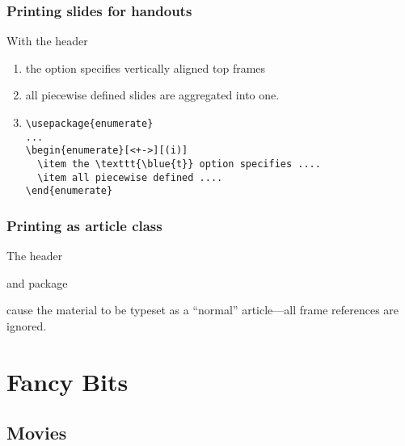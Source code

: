 \begin{frame}[fragile]
  \frametitle{Printing slides for handouts}

With the header

 {}

\begin{enumerate}[<+->][(i)]
\item the \texttt{} option specifies vertically aligned top frames
\item all piecewise defined slides are aggregated into one.

\item
\begin{verbatim}
\usepackage{enumerate}
...
\begin{enumerate}[<+->][(i)]
  \item the \texttt{\blue{t}} option specifies ....
  \item all piecewise defined ....
\end{enumerate}
\end{verbatim}
\end{enumerate}


\end{frame}


\begin{frame}
   \frametitle{Printing as article class}
 
The header

 {}
 
 and package
 
 {}
 
cause the material to be typeset as a ``normal'' article---all frame references are ignored.
 \end{frame}
 
\section{Fancy Bits}

\subsection{Movies}

